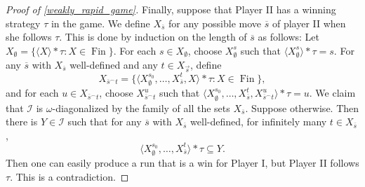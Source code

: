 \documentclass[a4paper,12pt]{amsart}
\theoremstyle{definition}
\numberwithin{thm}{section}
\numberwithin{equation}{section}
\newcommand{\I}{\mathscr{I}}
\DeclareMathOperator{\Fin}{Fin}
\renewcommand{\subset}{\subseteq}
\begin{document}
\begin{proof}[Proof of \cref{weakly_rapid_game}]
        Finally, suppose that Player II has a winning strategy $\tau$ in the game.  We define $X_{\overline{s}}$ for any possible move $\overline{s}$ of player II when she follows $\tau$. This is done by induction on the length of $\overline{s}$ as follows: Let $X_{\emptyset} = \{\langle X \rangle*\tau: X\in\Fin\}$. For each $s\in X_{\emptyset}$, choose $X^s_{\emptyset}$ such that $\langle X^s_{\emptyset}\rangle * \tau = s$. For any $\overline{s}$ with $X_{\overline{s}}$ well-defined and any $t\in X_{\vec{s}}$, define
        \[
        X_{\overline{s}^{\frown}t} = \{\langle X_{\emptyset}^{s_0}, \ldots, X_{\overline{s}}^t, X\rangle*\tau : X\in\Fin\},
        \]
        and for each $u\in X_{\overline{s}^{\frown}t}$, choose $X_{\overline{s}^{\frown}t}^u$ such that $\langle X_{\emptyset}^{s_0}, \ldots, X_{\overline{s}}^t, X_{\overline{s}^{\frown}t}^u\rangle * \tau = u$. We claim that $\I$ is $\omega$-diagonalized by the family of all the sets $X_{\overline{s}}$. Suppose otherwise. Then there is $Y\in\I$ such that for any $\overline{s}$ with $X_{\overline{s}}$ well-defined, for infinitely many $t \in X_{\overline{s}}$,
        \[
        \langle X_{\emptyset}^{s_0}, \ldots, X_{\overline{s}}^t\rangle*\tau \subset Y.
        \]
        Then one can easily produce a run that is a win for Player I, but Player II follows $\tau$. This is a contradiction.
    \end{proof}

    \printbibliography
\end{document}
